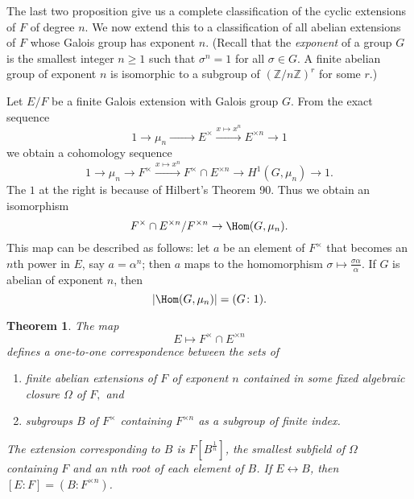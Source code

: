 \documentclass[a4paper,11pt,final,openany]{memoir}
\newtheorem{theorem}[X]{Theorem}
\theoremstyle{nonumberplain}
\begin{document}
The last two proposition give us a complete classification of the cyclic
extensions of $F$ of degree $n$. We now extend this to a classification of all
abelian extensions of $F$ whose Galois group has exponent $n$. (Recall that
the
%
\emph{exponent} of a group $G$ is the smallest integer $n\geq1$ such that
$\sigma^{n}=1$ for all $\sigma\in G$. A finite abelian group of exponent $n$
is isomorphic to a subgroup of $(\mathbb{Z}/n\mathbb{Z})^{r}$ for some $r$.)

Let $E/F$ be a finite Galois extension with Galois group $G$. From the exact
sequence
\[
1\rightarrow\mu_{n}\xrightarrow{\phantom{x\mapsto x^{n}}} E^{\times
}\xrightarrow{x\mapsto x^{n}}E^{\times n}\rightarrow1
\]
we obtain a cohomology sequence
\[
1\rightarrow\mu_{n}\rightarrow F^{\times}\xrightarrow{x\mapsto x^{n}}F^{\times
}\cap E^{\times n}\rightarrow H^{1}(G,\mu_{n})\rightarrow1.
\]
The $1$ at the right is because of Hilbert's Theorem 90. Thus we obtain an
isomorphism
\[
F^{\times}\cap E^{\times n}/F^{\times n}\rightarrow\Hom(G,\mu_{n}).
\]
This map can be described as follows: let $a$ be an element of $F^{\times}$
that becomes an $n$th power in $E$, say $a=\alpha^{n}$; then $a$ maps to the
homomorphism $\sigma\mapsto\frac{\sigma\alpha}{\alpha}$. If $G$ is abelian of
exponent $n$, then
\[
\left\vert \Hom(G,\mu_{n})\right\vert =(G\colon1).
\]


\begin{theorem}
\label{ag20a} The map
\[
E\mapsto F^{\times}\cap E^{\times n}%
\]
defines a one-to-one correspondence between the sets of

\begin{enumerate}
\item finite abelian extensions of $F$ of exponent $n$ contained in some fixed
algebraic closure $\Omega$ of $F,$ and

\item subgroups $B$ of $F^{\times}$ containing $F^{\times n}$ as a subgroup of
finite index.
\end{enumerate}

\noindent The extension corresponding to $B$ is $F[B^{\frac{1}{n}}]$, the
smallest subfield of $\Omega$ containing $F$ and an $n$th root of each element
of $B$. If $E\leftrightarrow B$, then $[E\colon F]=(B\colon F^{\times n})$.
\end{theorem}
\end{document}
